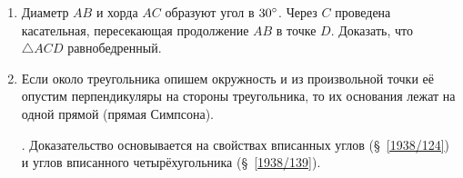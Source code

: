 \begin{enumerate}[resume]
\item
Диаметр $AB$ и хорда $AC$ образуют угол в $30\degree$.
Через $C$ проведена касательная, пересекающая продолжение $AB$ в точке $D$.
Доказать, что $\triangle ACD$ равнобедренный.

\item
Если около треугольника опишем окружность и из произвольной точки её опустим перпендикуляры на стороны треугольника, то их основания лежат на одной прямой (прямая Симпсона).

\smallskip
{}.
Доказательство основывается на свойствах вписанных углов (§~\ref{1938/124}) и углов вписанного четырёхугольника (§~\ref{1938/139}).


\end{enumerate}

\begin{center}
\end{center}

